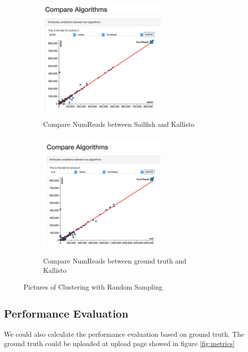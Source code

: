 \documentclass[11pt,letter]{article}
\begin{document}
\begin{figure}[h!]
        \centering
	\begin{subfigure}[h]{0.5\textwidth}
                \includegraphics[height=2.5in, width=2.5in]{fig/compare_sk.jpg}
		\caption{Compare NumReads between Sailfish and Kallisto }
                \label{fig:compare_sk}
        \end{subfigure}%
        \begin{subfigure}[h]{0.5\textwidth}
                \includegraphics[height=2.5in, width=2.5in]{fig/compare_truth.jpg}
                \caption{Compare NumReads between ground truth and Kallisto  }
                \label{fig:compare_truth}
        \end{subfigure}
        \caption{Pictures of Clustering with Random Sampling}\label{fig:cluster}
\end{figure}

\subsection {Performance Evaluation}
We could also calculate the performance evaluation based on ground truth. The ground truth could be uploaded at upload page showed in figure \ref{fig:metrics}
\end{document}

